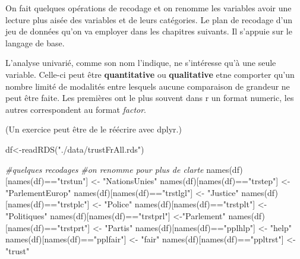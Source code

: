 \documentclass[
]{book}
\newenvironment{Shaded}{\begin{snugshade}}{\end{snugshade}}
\newcommand{\CommentTok}[1]{\textcolor[rgb]{0.56,0.35,0.01}{\textit{#1}}}
\newcommand{\FunctionTok}[1]{\textcolor[rgb]{0.00,0.00,0.00}{#1}}
\newcommand{\NormalTok}[1]{#1}
\newcommand{\OtherTok}[1]{\textcolor[rgb]{0.56,0.35,0.01}{#1}}
\newcommand{\SpecialCharTok}[1]{\textcolor[rgb]{0.00,0.00,0.00}{#1}}
\newcommand{\StringTok}[1]{\textcolor[rgb]{0.31,0.60,0.02}{#1}}
\begin{document}
On fait quelques opérations de recodage et on renomme les variables avoir une lecture plus aisée des variables et de leurs catégories. Le plan de recodage d'un jeu de données qu'on va employer dans les chapitres suivants. Il s'appuie sur le langage de base.

L'analyse univarié, comme son nom l'indique, ne s'intéresse qu'à une seule variable. Celle-ci peut être \textbf{quantitative} ou \textbf{qualitative} etne comporter qu'un nombre limité de modalités entre lesquels aucune comparaison de grandeur ne peut être faite. Les premières ont le plus souvent dans r un format numeric, les autres correspondent au format \emph{factor}.

(Un exercice peut être de le réécrire avec dplyr.)

\begin{Shaded}
\begin{Highlighting}[]
\NormalTok{df}\OtherTok{\textless{}{-}}\FunctionTok{readRDS}\NormalTok{(}\StringTok{"./data/trustFrAll.rds"}\NormalTok{)}

\CommentTok{\#quelques recodages}
\CommentTok{\#on renomme pour plus de clarte}
\FunctionTok{names}\NormalTok{(df)[}\FunctionTok{names}\NormalTok{(df)}\SpecialCharTok{==}\StringTok{"trstun"}\NormalTok{] }\OtherTok{\textless{}{-}} \StringTok{"NationsUnies"} 
\FunctionTok{names}\NormalTok{(df)[}\FunctionTok{names}\NormalTok{(df)}\SpecialCharTok{==}\StringTok{"trstep"}\NormalTok{] }\OtherTok{\textless{}{-}} \StringTok{"ParlementEurop"} 
\FunctionTok{names}\NormalTok{(df)[}\FunctionTok{names}\NormalTok{(df)}\SpecialCharTok{==}\StringTok{"trstlgl"}\NormalTok{] }\OtherTok{\textless{}{-}} \StringTok{"Justice"} 
\FunctionTok{names}\NormalTok{(df)[}\FunctionTok{names}\NormalTok{(df)}\SpecialCharTok{==}\StringTok{"trstplc"}\NormalTok{] }\OtherTok{\textless{}{-}} \StringTok{"Police"} 
\FunctionTok{names}\NormalTok{(df)[}\FunctionTok{names}\NormalTok{(df)}\SpecialCharTok{==}\StringTok{"trstplt"}\NormalTok{] }\OtherTok{\textless{}{-}} \StringTok{"Politiques"} 
\FunctionTok{names}\NormalTok{(df)[}\FunctionTok{names}\NormalTok{(df)}\SpecialCharTok{==}\StringTok{"trstprl"}\NormalTok{] }\OtherTok{\textless{}{-}}\StringTok{"Parlement"} 
\FunctionTok{names}\NormalTok{(df)[}\FunctionTok{names}\NormalTok{(df)}\SpecialCharTok{==}\StringTok{"trstprt"}\NormalTok{] }\OtherTok{\textless{}{-}} \StringTok{"Partis"}
\FunctionTok{names}\NormalTok{(df)[}\FunctionTok{names}\NormalTok{(df)}\SpecialCharTok{==}\StringTok{"pplhlp"}\NormalTok{] }\OtherTok{\textless{}{-}} \StringTok{"help"}
\FunctionTok{names}\NormalTok{(df)[}\FunctionTok{names}\NormalTok{(df)}\SpecialCharTok{==}\StringTok{"pplfair"}\NormalTok{] }\OtherTok{\textless{}{-}} \StringTok{"fair"}
\FunctionTok{names}\NormalTok{(df)[}\FunctionTok{names}\NormalTok{(df)}\SpecialCharTok{==}\StringTok{"ppltrst"}\NormalTok{] }\OtherTok{\textless{}{-}} \StringTok{"trust"}


\end{Highlighting}
\end{Shaded}
\end{document}

